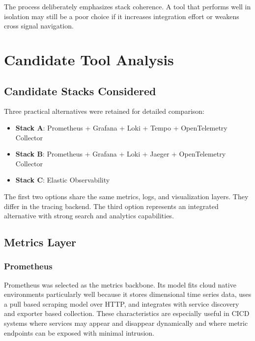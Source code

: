 The process deliberately emphasizes stack coherence. A tool that performs well in isolation may still be a poor choice if it increases integration effort or weakens cross signal navigation.

\section{Candidate Tool Analysis}
\label{sec:candidate_tools}

\subsection{Candidate Stacks Considered}
\label{subsec:candidate_stacks}

Three practical alternatives were retained for detailed comparison:
\begin{itemize}
    \item \textbf{Stack A}: Prometheus + Grafana + Loki + Tempo + OpenTelemetry Collector
    \item \textbf{Stack B}: Prometheus + Grafana + Loki + Jaeger + OpenTelemetry Collector
    \item \textbf{Stack C}: Elastic Observability
\end{itemize}

The first two options share the same metrics, logs, and visualization layers. They differ in the tracing backend. The third option represents an integrated alternative with strong search and analytics capabilities.

\subsection{Metrics Layer}
\label{subsec:monitoring_tools}

\subsubsection{Prometheus}
\label{subsubsec:prometheus}

Prometheus was selected as the metrics backbone. Its model fits cloud native environments particularly well because it stores dimensional time series data, uses a pull based scraping model over HTTP, and integrates with service discovery and exporter based collection. These characteristics are especially useful in \gls{CICD} systems where services may appear and disappear dynamically and where metric endpoints can be exposed with minimal intrusion.

